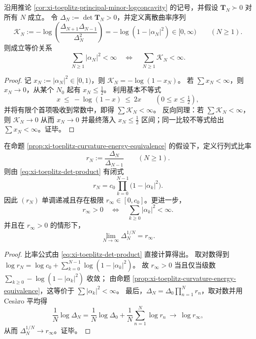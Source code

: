 \begin{proposition}\label{prop:xi-toeplitz-curvature-energy-equivalence}
沿用推论 \ref{cor:xi-toeplitz-principal-minor-logconcavity} 的记号，并假设 \(\mathbf{T}_N\succ 0\) 对所有 \(N\) 成立。
令 \(\Delta_N:=\det\mathbf{T}_N>0\)，并定义离散曲率序列
\[
\mathcal{K}_N:=-\log\!\left(\frac{\Delta_{N+1}\Delta_{N-1}}{\Delta_N^{2}}\right)
=-\log(1-|\alpha_N|^2)\in[0,\infty)\qquad(N\ge 1).
\]
则成立等价关系
\[
\boxed{\;
\sum_{N\ge 1}|\alpha_N|^2<\infty
\quad\Longleftrightarrow\quad
\sum_{N\ge 1}\mathcal{K}_N<\infty.\;}
\]
\end{proposition}
\begin{proof}
记 \(x_N:=|\alpha_N|^2\in[0,1)\)，则 \(\mathcal{K}_N=-\log(1-x_N)\)。
若 \(\sum x_N<\infty\)，则 \(x_N\to 0\)，从某个 \(N_0\) 起有 \(x_N\le \tfrac12\)。
利用基本不等式
\[
x\ \le\ -\log(1-x)\ \le\ 2x\qquad(0\le x\le\tfrac12),
\]
并将有限个首项吸收到常数中，即得 \(\sum \mathcal{K}_N<\infty\)。
反向同理：若 \(\sum\mathcal{K}_N<\infty\)，则 \(\mathcal{K}_N\to 0\) 从而 \(x_N\to 0\) 并最终落入 \(x_N\le\tfrac12\) 区间；同一比较不等式给出 \(\sum x_N<\infty\)。证毕。
\end{proof}

\begin{proposition}\label{prop:xi-toeplitz-determinant-ratio-limit-l2}
在命题 \ref{prop:xi-toeplitz-curvature-energy-equivalence} 的假设下，定义行列式比率
\[
r_N:=\frac{\Delta_N}{\Delta_{N-1}}\qquad(N\ge 1).
\]
则由 \eqref{eq:xi-toeplitz-det-product} 有闭式
\[
\boxed{\;
r_N=c_0\prod_{k=0}^{N-1}\bigl(1-|\alpha_k|^2\bigr).\;}
\]
因此 \((r_N)\) 单调递减且存在极限 \(r_\infty\in[0,c_0]\)。更进一步，
\[
\boxed{\;
r_\infty>0
\quad\Longleftrightarrow\quad
\sum_{k\ge 0}|\alpha_k|^2<\infty.\;}
\]
并且在 \(r_\infty>0\) 的情形下，
\[
\boxed{\;\lim_{N\to\infty}\Delta_N^{1/N}=r_\infty.\;}
\]
\end{proposition}
\begin{proof}
比率公式由 \eqref{eq:xi-toeplitz-det-product} 直接计算得出。
取对数得到
\(
\log r_N=\log c_0+\sum_{k=0}^{N-1}\log(1-|\alpha_k|^2)
\)。
故 \(r_\infty>0\) 当且仅当级数 \(\sum_{k\ge 0}-\log(1-|\alpha_k|^2)\) 收敛；
由命题 \ref{prop:xi-toeplitz-curvature-energy-equivalence}，这等价于 \(\sum|\alpha_k|^2<\infty\)。
最后，\(\Delta_N=\Delta_0\prod_{n=1}^N r_n\)，取对数并用 Ces\`aro 平均得
\[
\frac{1}{N}\log\Delta_N=\frac{1}{N}\log\Delta_0+\frac{1}{N}\sum_{n=1}^N\log r_n\ \longrightarrow\ \log r_\infty,
\]
从而 \(\Delta_N^{1/N}\to r_\infty\)。证毕。
\end{proof}

